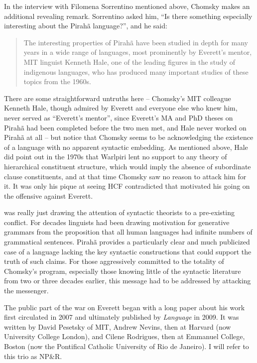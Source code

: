 \documentclass[output=paper,colorlinks,citecolor=brown
]{langscibook}
\begin{document}
In the interview with Filomena Sorrentino mentioned above, Chomsky makes
an additional revealing remark.  Sorrentino asked him, ``Is there something
especially interesting about the Pirah{\~a} language?'', and he said:
\begin{quote}
The interesting properties of Pirah{\~a} have been studied in depth for
many years in a wide range of languages, most prominently by Everett's
mentor, MIT linguist Kenneth Hale, one of the leading figures in the
study of indigenous languages, who has produced many important studies
of these topics from the 1960s.
\end{quote}
There are some straightforward untruths here -- Chomsky's MIT colleague
Kenneth Hale, though admired by Everett and everyone else who knew him,
never served as ``Everett's mentor'', since Everett's MA and PhD theses on
Pirah{\~a} had been completed before the two men met, and Hale never
worked on Pirah{\~a} at all -- but notice that Chomsky seems to be
acknowledging the existence of a language with no apparent syntactic
embedding. As mentioned above, Hale did point out in the 1970s that
Warlpiri lent no support to any theory of hierarchical constituent
structure, which would imply the absence of subordinate clause
constituents, and at that time Chomsky saw no reason to attack him
for it. It was only his pique at seeing HCF contradicted that motivated
his going on the offensive against Everett.

\citet{Everett05} was really just drawing the attention of syntactic
theorists to a pre-existing conflict. For decades linguists had been
drawing motivation for generative grammars from the proposition that
all human languages had infinite numbers of grammatical sentences.
Pirah{\~a} provides a particularly clear and much publicized case of
a language lacking the key syntactic constructions that could support
the truth of such claims. For those aggressively committed to the
totality of Chomsky's program, especially those knowing little of the
syntactic literature from two or three decades earlier, this message
had to be addressed by attacking the messenger.

The public part of the war on Everett began with a long paper about
his work first circulated in 2007 and ultimately published by
\textit{Language} in 2009. It was written by David Pesetsky of MIT,
Andrew Nevins, then at Harvard (now University College London), and
Cilene Rodrigues, then at Emmanuel College, Boston (now the Pontifical
Catholic University of Rio de Janeiro). I will refer to this trio
as NP\&R.
\end{document}
